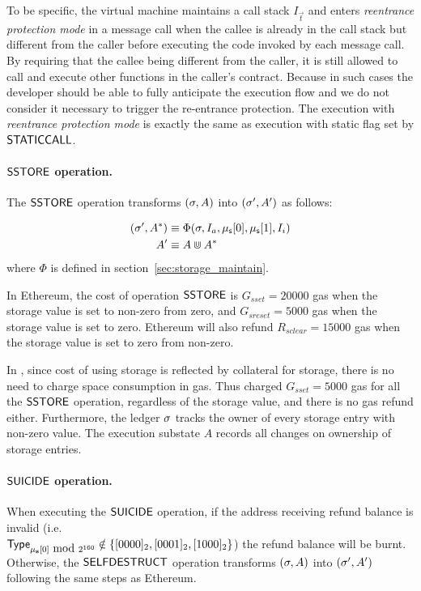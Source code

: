 To be specific, the {\name} virtual machine maintains a call stack $I_\vec{t}$ and 
enters \emph{reentrance protection mode} in a message call
when the callee is already in the call stack but different from the caller before executing the code invoked by each message call.
By requiring that the callee being different from the caller, it is still allowed to call and execute other functions in the caller's contract.
Because in such cases the developer should be able to fully anticipate the execution flow
and we do not consider it necessary to trigger the re-entrance protection.
%
The execution with \emph{reentrance protection mode} is exactly the same as execution with static flag set by $\mathsf{STATICCALL}$. %




\paragraph{$\mathsf{SSTORE}$ operation.} 
The $\mathsf{SSTORE}$ operation transforms $(\mathbf{\sigma},A)$ into $(\mathbf{\sigma}',A')$ as follows:

\begin{align}
	(\mathbf{\sigma}', A^*)   &\equiv \Phi(\mathbf{\sigma},I_a, \mathbf{\mu}_{\sf s}[0],\mathbf{\mu}_{\sf s}[1],I_i) \\ 
	A'     &\equiv A \Cup A^*
\end{align}
%
where $\Phi$ is defined in section~\ref{sec:storage_maintain}.

In Ethereum, the cost of operation $\mathsf{SSTORE}$ is $G_{sset}=20000$ gas when the storage value is set to non-zero from zero,
and  $G_{sreset}=5000$ gas when the storage value is set to zero. 
Ethereum will also refund $R_{sclear}=15000$ gas when the storage value is set to zero from non-zero. 

In {\name}, since cost of using storage is reflected by collateral for storage, there is no need to charge space consumption in gas. 
Thus {\name} charged $G_{sset}=5000$ gas for all the $\mathsf{SSTORE}$ operation, 
regardless of the storage value,
and there is no gas refund either. 
Furthermore, the {\name} ledger $\mathbf{\sigma}$ tracks the owner of every storage entry with non-zero value. 
The execution substate $A$ records all changes on ownership of storage entries. 

\paragraph{$\mathsf{SUICIDE}$ operation.} When executing the $\mathsf{SUICIDE}$ operation, if the address receiving refund balance is invalid (i.e. \\$\mathsf{Type}_{\mathbf{\mu}_{\mathbf{s}}[0]\mbox{ mod }2^{160}}\notin{\left \{{\ensuremath{[0000]_2},\ensuremath{[0001]_2},\ensuremath{[1000]_2}} \right \}}$) the refund balance will be burnt. Otherwise, the $\mathsf{SELFDESTRUCT}$ operation transforms $(\mathbf{\sigma},A)$ into $(\mathbf{\sigma}',A')$ following the same steps as Ethereum. 

